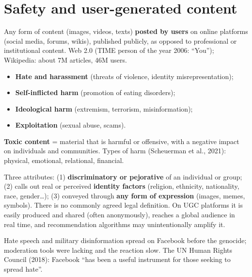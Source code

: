 \documentclass[11pt,a4paper,openany]{book}
\begin{document}
\section{Safety and user-generated content}

\begin{defnbox}[title={User-generated content, UGC (Bolin, 2021; Naab \& Sehl, 2016)}]
Any form of content (images, videos, texts) \textbf{posted by users} on online platforms (social
media, forums, wikis), published publicly, as opposed to professional or institutional content.
Web 2.0 (TIME person of the year 2006: ``You''); Wikipedia: about 7M articles, 46M users.
\end{defnbox}

\begin{propbox}[title={How UGC creates harm (Banko et al., 2020)}]
\begin{itemize}
  \item \textbf{Hate and harassment} (threats of violence, identity misrepresentation);
  \item \textbf{Self-inflicted harm} (promotion of eating disorders);
  \item \textbf{Ideological harm} (extremism, terrorism, misinformation);
  \item \textbf{Exploitation} (sexual abuse, scams).
\end{itemize}
\textbf{Toxic content} = material that is harmful or offensive, with a negative impact on
individuals and communities. Types of harm (Scheuerman et al., 2021): physical, emotional,
relational, financial.
\end{propbox}

\begin{defnbox}[title={Hate speech (United Nations, 2019)}]
Three attributes: (1) \textbf{discriminatory or pejorative} of an individual or group; (2)
calls out real or perceived \textbf{identity factors} (religion, ethnicity, nationality, race,
gender\ldots); (3) conveyed through \textbf{any form of expression} (images, memes, symbols).
There is no commonly agreed legal definition. On UGC platforms it is easily produced and shared
(often anonymously), reaches a global audience in real time, and recommendation algorithms may
unintentionally amplify it.
\end{defnbox}

\begin{exbox}[title={Facebook and the Rohingya (Myanmar, 2017)}]
Hate speech and military disinformation spread on Facebook before the genocide; moderation tools
were lacking and the reaction slow. The UN Human Rights Council (2018): Facebook ``has been a
useful instrument for those seeking to spread hate''.
\end{exbox}
\end{document}
